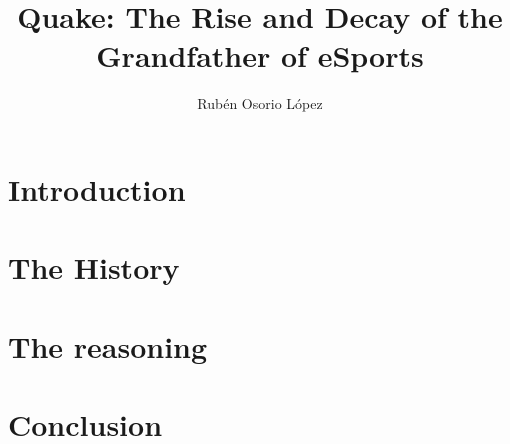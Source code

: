 \documentclass[twocolumn]{article}
\title{Quake: The Rise and Decay of the Grandfather of eSports}
\author{Rubén Osorio López}
\begin{document}
\maketitle

\listoftodos

\begin{abstract}

\end{abstract}

\section{Introduction}


\section{The History}


\section{The reasoning}


\section{Conclusion}

\end{document}
